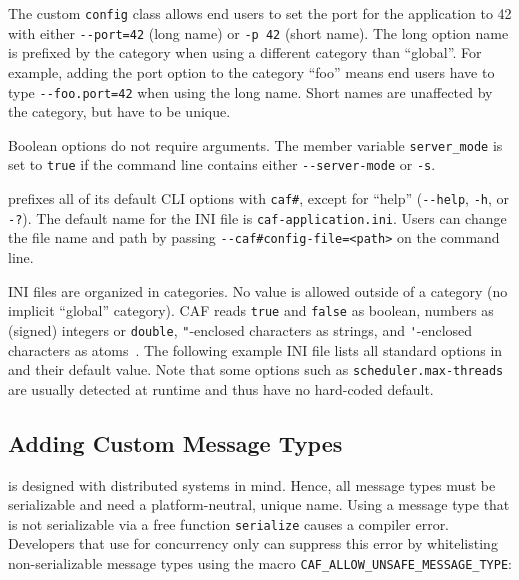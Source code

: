 The custom \lstinline^config^ class allows end users to set the port for the application to 42 with either \lstinline^--port=42^ (long name) or \lstinline^-p 42^ (short name). The long option name is prefixed by the category when using a different category than ``global''. For example, adding the port option to the category ``foo'' means end users have to type \lstinline^--foo.port=42^ when using the long name. Short names are unaffected by the category, but have to be unique.

Boolean options do not require arguments. The member variable \lstinline^server_mode^ is set to \lstinline^true^ if the command line contains either \lstinline^--server-mode^ or \lstinline^-s^.

\lib prefixes all of its default CLI options with \lstinline^caf#^, except for ``help'' (\lstinline^--help^, \lstinline^-h^, or \lstinline^-?^). The default name for the INI file is \lstinline^caf-application.ini^. Users can change the file name and path by passing \lstinline^--caf#config-file=<path>^ on the command line.

INI files are organized in categories. No value is allowed outside of a category (no implicit ``global'' category). CAF reads \lstinline^true^ and \lstinline^false^ as boolean, numbers as (signed) integers or \lstinline^double^, \lstinline^"^-enclosed characters as strings, and \lstinline^'^-enclosed characters as atoms~. The following example INI file lists all standard options in \lib and their default value. Note that some options such as \lstinline^scheduler.max-threads^ are usually detected at runtime and thus have no hard-coded default.



\subsection{Adding Custom Message Types}

\lib is designed with distributed systems in mind. Hence, all message types must be serializable and need a platform-neutral, unique name. Using a message type that is not serializable via a free function \lstinline^serialize^ causes a compiler error. Developers that use \lib for concurrency only can suppress this error by whitelisting non-serializable message types using the macro \lstinline^CAF_ALLOW_UNSAFE_MESSAGE_TYPE^:



